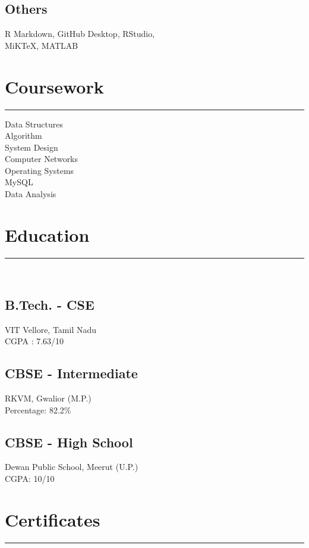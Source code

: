 \documentclass[]{meetresume-class}
\begin{document}
\begin{minipage}[t]{0.33\textwidth}
		\subsection{Others}
		R Markdown, GitHub Desktop, RStudio,\\
		MiKTeX, MATLAB
		\sectionsep
		\section{Coursework}
		\noindent\rule{5cm}{0.6pt}
		
		Data Structures\\
		Algorithm\\
		System Design\\
		Computer Networks\\
		Operating Systems\\
		MySQL\\
		Data Analysis
		\sectionsep
		\section{Education} 
		\noindent\rule{5cm}{0.6pt}\\
		\subsection{B.Tech. - CSE}
		VIT Vellore, Tamil Nadu \\
		CGPA : 7.63/10\\
		\vspace{8pt}
		\subsection{CBSE - Intermediate}
		RKVM, Gwalior (M.P.)\\
		Percentage: 82.2\%\\
		\vspace{8pt}
		\subsection{CBSE - High School}
		Dewan Public School, Meerut (U.P.)\\
		CGPA: 10/10
		\sectionsep
		\section{Certificates}
		\noindent\rule{5cm}{0.6pt}\\
		
	\end{minipage} 
\end{document}
